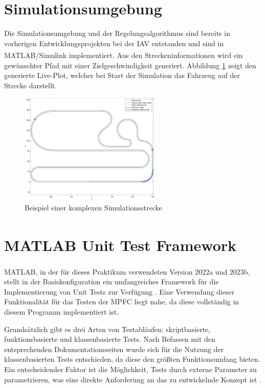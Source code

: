 \section{Simulationsumgebung} \label{sec:Simulationsumgebung}
Die Simulationsumgebung und der Regelungsalgorithmus sind bereits in vorherigen Entwicklungsprojekten bei der IAV entstanden und sind in MATLAB\textsuperscript{\textregistered}/Simulink implementiert. Aus den Streckeninformationen wird ein gewünschter Pfad mit einer Zielgeschwindigkeit generiert. Abbildung \ref{fig:Simulation_Strecke} zeigt den generierte Live-Plot, welcher bei Start der Simulation das Fahrzeug auf der Strecke darstellt.
\begin{figure}[ht]
    \centering
    \includegraphics[width=0.6\textwidth]{figures/3_Implementierung/simulationsumgebung.pdf}
    \caption{Beispiel einer komplexen Simulationsstrecke}
    \label{fig:Simulation_Strecke}
\end{figure}

\section{MATLAB\textsuperscript{\textregistered} Unit Test Framework} \label{sec:MatlabUnitTest}
MATLAB\textsuperscript{\textregistered}, in der für dieses Praktikum verwendeten Version 2022a und 2023b, stellt in der Basiskonfiguration ein umfangreiches Framework für die Implementierung von Unit Tests zur Verfügung \cite{matlabTest}. Eine Verwendung dieser Funktionalität für das Testen der MPFC liegt nahe, da diese vollständig in diesem Programm implementiert ist.

Grundsätzlich gibt es drei Arten von Testabläufen: skriptbasierte, funktionsbasierte und klassenbasierte Tests. Nach Befassen mit den entsprechenden Dokumentationsseiten wurde sich für die Nutzung der klassenbasierten Tests entschieden, da diese den größten Funktionsumfang bieten. Ein entscheidender Faktor ist die Möglichkeit, Tests durch externe Parameter zu parametrieren, was eine direkte Anforderung an das zu entwickelnde Konzept ist \cite{matlabTest}.


